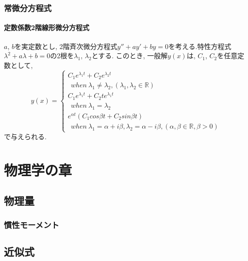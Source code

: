 \documentclass[]{jreport}
\begin{document}
\section{常微分方程式}
\subsection{定数係数2階線形微分方程式}

$a$, $b$を実定数とし, 2階斉次微分方程式$y''+ay'+by=0$を考える.特性方程式$\lambda^2+a\lambda+b=0$の2根を$\lambda_{1}$, $\lambda_{2}$とする. このとき, 一般解$y(x)$は, $C_{1}$, $C_{2}$を任意定数として, \\
\begin{equation}
    y(x)= \left \{
        \begin{array}{l}
            C_{1}e^{\lambda_{1} t}+C_{2}e^{\lambda_{2} t}\\
            \ \ when \ \lambda_{1}\neq\lambda_{2}, (\lambda_{1}, \lambda_{2}\in\mathbb{R}) \\
            C_{1}e^{\lambda_{1} t}+C_{2}te^{\lambda_{1} t}\\
            \ \ when \ \lambda_{1}=\lambda_{2} \\
            e^{\alpha t}(C_{1}cos{\beta t}+C_{2}sin{\beta t}) \\
            \ \ when \ \lambda_{1}=\alpha+{i\beta}, \lambda_{2}=\alpha-{i\beta}, (\alpha, \beta\in\mathbb{R}, \beta>0)
        \end{array}
    \right.
\end{equation}
で与えられる.

\part{物理学の章}
\chapter{物理量}

\section{慣性モーメント}

\chapter{近似式}
\end{document}
